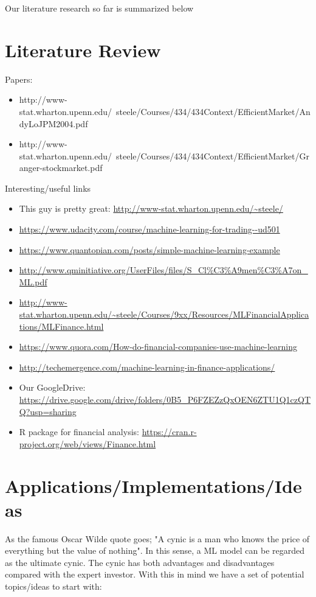 \documentclass[12pt, oneside]{article}
\begin{document}
Our literature research so far  is summarized below
\section*{Literature Review}


Papers: 
\begin{itemize}
\item http://www-stat.wharton.upenn.edu/~steele/Courses/434/434Context/EfficientMarket/AndyLoJPM2004.pdf

\item http://www-stat.wharton.upenn.edu/~steele/Courses/434/434Context/EfficientMarket/Granger-stockmarket.pdf

\end{itemize}

Interesting/useful links
\begin{itemize}
\item This guy is pretty great: \url{http://www-stat.wharton.upenn.edu/~steele/}
\item \url{https://www.udacity.com/course/machine-learning-for-trading--ud501}
\item \url{https://www.quantopian.com/posts/simple-machine-learning-example}
\item \url{http://www.qminitiative.org/UserFiles/files/S_Cl\%C3\%A9men\%C3\%A7on_ML.pdf}
\item \url{http://www-stat.wharton.upenn.edu/~steele/Courses/9xx/Resources/MLFinancialApplications/MLFinance.html}
\item \url{https://www.quora.com/How-do-financial-companies-use-machine-learning}
\item \url{http://techemergence.com/machine-learning-in-finance-applications/}
\item Our GoogleDrive: \url{https://drive.google.com/drive/folders/0B5_P6FZEZzQxOEN6ZTU1Q1czQTQ?usp=sharing}
\item R package for financial analysis: \url{https://cran.r-project.org/web/views/Finance.html}


\end{itemize}

\section*{Applications/Implementations/Ideas}

As the famous Oscar Wilde quote goes; "A cynic is a man who knows the price of everything but the value of nothing". In this sense, a ML model can be regarded as the ultimate cynic. The cynic has both advantages and disadvantages compared with the expert investor. With this in mind we have a set of potential topics/ideas to start with:
\end{document}
